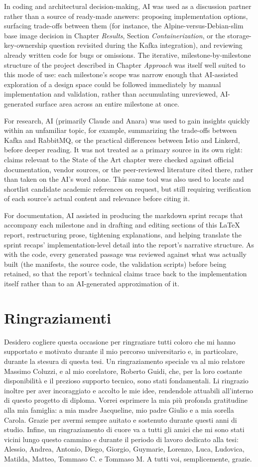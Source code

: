 \documentclass[twoside]{supsistudent}
\newcommand{\problemchapter}[1]{%
  \chapter*{#1}%
  \addcontentsline{toc}{chapter}{#1}%
\markboth{#1}{#1}
}
\begin{document}
In coding and architectural decision-making, AI was used as a discussion partner rather than a source of ready-made answers: proposing implementation options, surfacing trade-offs between them (for instance, the Alpine-versus-Debian-slim base image decision in Chapter \emph{Results}, Section \emph{Containerization}, or the storage-key-ownership question revisited during the Kafka integration), and reviewing already written code  for bugs or omissions. The iterative, milestone-by-milestone structure of the project described in Chapter \emph{Approach} was itself well suited to this mode of use: each milestone's scope was narrow enough that AI-assisted exploration of a design space could be followed immediately by manual implementation and validation, rather than accumulating unreviewed, AI-generated surface area across an entire milestone at once.

For research, AI (primarily Claude and Anara) was used to gain insights quickly within an unfamiliar topic, for example, summarizing the trade-offs between Kafka and RabbitMQ, or the practical differences between Istio and Linkerd, before deeper reading. It was not treated as a primary source in its own right: claims relevant to the State of the Art chapter were checked against official documentation, vendor sources, or the peer-reviewed literature cited there, rather than taken on the AI's word alone. This same tool was also used to locate and shortlist candidate academic references on request, but still requiring verification of each source's actual content and relevance before citing it.

For documentation, AI assisted in producing the markdown sprint recaps that accompany each milestone and in drafting and editing sections of this LaTeX report, restructuring prose, tightening explanations, and helping translate the sprint recaps' implementation-level detail into the report's narrative structure. As with the code, every generated passage was reviewed against what was actually built (the manifests, the source code, the validation scripts) before being retained, so that the report's technical claims trace back to the implementation itself rather than to an AI-generated approximation of it.

\problemchapter{Ringraziamenti}
Desidero cogliere questa occasione per ringraziare tutti coloro che mi hanno supportato e motivato durante il mio percorso universitario e, in particolare, durante la stesura di questa tesi.
Un ringraziamento speciale va al mio relatore Massimo Coluzzi, e al mio corelatore, Roberto Guidi, che, per la loro costante disponibilità e il prezioso supporto tecnico, sono stati fondamentali. Li ringrazio inoltre per aver incoraggiato e accolto le mie idee, rendendole attuabili all'interno di questo progetto di diploma.
Vorrei esprimere la mia più profonda gratitudine alla mia famiglia: a mia madre Jacqueline, mio padre Giulio e a mia sorella Carola. Grazie per avermi sempre auitato e sostenuto durante questi anni di studio.
Infine, un ringraziamento di cuore va a tutti gli amici che mi sono stati vicini lungo questo cammino e durante il periodo di lavoro dedicato alla tesi: Alessio, Andrea, Antonio, Diego, Giorgio, Guymarie, Lorenzo, Luca, Ludovica, Matilda, Matteo, Tommaso C. e Tommaso M.
A tutti voi, semplicemente, grazie.
\end{document}
